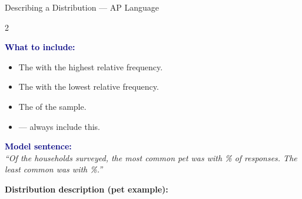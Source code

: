 \documentclass[10pt]{article}
\begin{document}
\begin{notesbox}{Describing a Distribution --- AP Language}
\small
\begin{multicols}{2}

\textbf{\textcolor{navy}{What to include:}}
\begin{itemize}[itemsep=3pt]
  \item The  with the highest relative frequency.
  \item The  with the lowest relative frequency.
  \item The  of the sample.
  \item {} --- always include this.
\end{itemize}

\columnbreak

\textbf{\textcolor{navy}{Model sentence:}}\\[4pt]
\textit{``Of the  households surveyed, the most common
pet was  with \% of responses.
The least common was  with \%.''}

\end{multicols}

\vspace{6pt}
\textbf{Distribution description (pet example):}\\[4pt]

\end{notesbox}

\vspace{0.1in}
\end{document}
